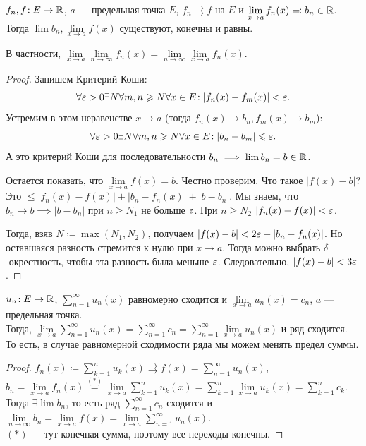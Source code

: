 \begin{theorem}
    $f_n, f\!: E \to \mathbb{R}$,  $a$ --- предельная точка  $E$,  $f_n \rightrightarrows f$ на  $E$ и  $\lim\limits_{x \to a} f_n(x) \eqqcolon b_n \in \mathbb{R}$. Тогда  $\lim b_n, \lim\limits_{x \to a} f(x)$ существуют, конечны и равны.

    В частности, $\lim\limits_{x \to a} \lim\limits_{n \to \infty} f_n(x) = \lim\limits_{n \to \infty} \lim\limits_{x \to a} f_n(x)$.
\end{theorem}
\begin{proof}
    Запишем Критерий Коши:
    \[\forall \varepsilon > 0 \exists N\forall m, n \geqslant N \forall x \in E\!: |f_n(x) - f_m(x)| < \varepsilon.\] 
    Устремим в этом неравенстве $x \to a$ (тогда $f_n(x) \to b_n, f_m(x) \to b_m$):
    \[
    \forall \varepsilon > 0 \exists N\forall m, n \geqslant N \forall x \in E\!: |b_n - b_m| \leqslant \varepsilon 
    .\] А это критерий Коши для последовательности $b_n \implies \lim b_n = b \in \mathbb{R}$.

    Остается показать, что $\lim\limits_{x \to a} f(x) = b$. Честно проверим. Что такое $|f(x) - b|$? Это  $\le |f_n(x) - f(x)| + |b_n - f_n(x)| + |b-b_n|$. Мы знаем, что $b_n \to b \implies |b-b_n|$ при  $n \ge N_1$ не больше $\varepsilon$. При  $n \ge N_2$ $|f_n(x) - f(x)| < \varepsilon$. 

    Тогда, взяв  $N \coloneqq \max(N_1, N_2)$, получаем $|f(x) - b| < 2\varepsilon + |b_n - f_n(x)|$. Но оставшаяся разность стремится к нулю при  $x \to a$. Тогда можно выбрать $\delta$-окрестность, чтобы эта разность  была меньше $\varepsilon$. Следовательно,  $|f(x) - b| < 3\varepsilon$.
\end{proof}
\begin{theorem}
    $u_n\!: E \to \mathbb{R}$,  $\sum\limits_{n=1}^\infty u_n(x)$ равномерно сходится и $\lim\limits_{x \to a}u_n(x) = c_n$, $a$ --- предельная точка.
\\
   Тогда,  $\lim\limits_{x \to a} \sum\limits_{n=1}^\infty u_n(x) = \sum\limits_{n=1}^\infty c_n = \sum\limits_{n=1}^\infty \lim\limits_{x \to a}u_n(x)$ и ряд сходится.
\\
   То есть, в случае равномерной сходимости ряда мы можем менять предел суммы.
\end{theorem}
\begin{proof}
    $f_n(x) \coloneqq \sum\limits_{k=1}^n u_k(x) \rightrightarrows f(x) = \sum\limits_{n=1}^\infty u_n(x)$, $b_n = \lim\limits_{x \to a} f_n(x) \overset{(*)}{=} \lim\limits_{x \to a} \sum\limits_{k=1}^n u_k(x) = \sum\limits_{k=1}^n \lim\limits_{x \to a} u_k(x) = \sum\limits_{k=1}^n c_k$.
\\
    Тогда $\exists \lim b_n$, то есть ряд $\sum\limits_{n=1}^\infty c_n$ сходится и $\lim\limits_{n \to \infty} b_n = \lim\limits_{x \to a} f(x) = \lim\limits_{x \to a} \sum\limits_{n=1}^\infty u_n(x)$.
\\
     $(*)$ --- тут конечная сумма, поэтому все переходы конечны.
\end{proof}

